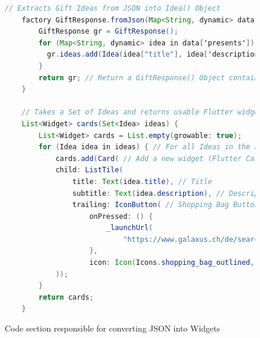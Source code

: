 \begin{figure}[!h]
	\begin{lstlisting}[language=Java]
    // Extracts Gift Ideas from JSON into Idea() Object
    factory GiftResponse.fromJson(Map<String, dynamic> data) {
        GiftResponse gr = GiftResponse();
        for (Map<String, dynamic> idea in data['presents']) { // Extract "present" objects
          gr.ideas.add(Idea(idea["title"], idea['description'])); // Fill information into new Idea() Object
        }
        return gr; // Return a GiftResponse() Object containing Ideas()
    }

    // Takes a Set of Ideas and returns usable Flutter widgets to display in the app
    List<Widget> cards(Set<Idea> ideas) {
        List<Widget> cards = List.empty(growable: true);
        for (Idea idea in ideas) { // For all Ideas in the List
            cards.add(Card( // Add a new widget (Flutter Card Widget in this Case)
            child: ListTile(
                title: Text(idea.title), // Title
                subtitle: Text(idea.description), // Description
                trailing: IconButton( // Shopping Bag Button
                    onPressed: () {
                        _launchUrl(
                            "https://www.galaxus.ch/de/search?searchSectors=0&q=${idea.title}");
                    },
                    icon: Icon(Icons.shopping_bag_outlined, color: Colors.green,))),
            ));
        }
        return cards;
    }
\end{lstlisting}
	\caption{Code section responsible for converting JSON into Widgets}
\end{figure}
